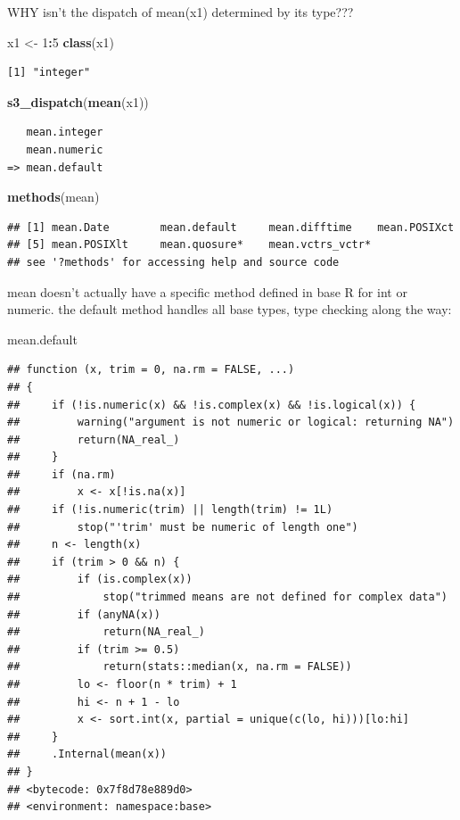\documentclass[]{book}
\newenvironment{Shaded}{\begin{snugshade}}{\end{snugshade}}
\newcommand{\DecValTok}[1]{\textcolor[rgb]{0.00,0.00,0.81}{#1}}
\newcommand{\KeywordTok}[1]{\textcolor[rgb]{0.13,0.29,0.53}{\textbf{#1}}}
\newcommand{\NormalTok}[1]{#1}
\newcommand{\OperatorTok}[1]{\textcolor[rgb]{0.81,0.36,0.00}{\textbf{#1}}}
\newcommand{\StringTok}[1]{\textcolor[rgb]{0.31,0.60,0.02}{#1}}
\begin{document}
WHY isn't the dispatch of mean(x1) determined by its type???

\begin{Shaded}
\begin{Highlighting}[]
\NormalTok{x1 <-}\StringTok{ }\DecValTok{1}\OperatorTok{:}\DecValTok{5}
\KeywordTok{class}\NormalTok{(x1)}
\end{Highlighting}
\end{Shaded}

\begin{verbatim}
[1] "integer"
\end{verbatim}

\begin{Shaded}
\begin{Highlighting}[]
\KeywordTok{s3_dispatch}\NormalTok{(}\KeywordTok{mean}\NormalTok{(x1))}
\end{Highlighting}
\end{Shaded}

\begin{verbatim}
   mean.integer
   mean.numeric
=> mean.default
\end{verbatim}

\begin{Shaded}
\begin{Highlighting}[]
\KeywordTok{methods}\NormalTok{(mean)}
\end{Highlighting}
\end{Shaded}

\begin{verbatim}
## [1] mean.Date        mean.default     mean.difftime    mean.POSIXct    
## [5] mean.POSIXlt     mean.quosure*    mean.vctrs_vctr*
## see '?methods' for accessing help and source code
\end{verbatim}

mean doesn't actually have a specific method defined in base R for int or numeric. the default method handles all base types, type checking along the way:

\begin{Shaded}
\begin{Highlighting}[]
\NormalTok{mean.default}
\end{Highlighting}
\end{Shaded}

\begin{verbatim}
## function (x, trim = 0, na.rm = FALSE, ...) 
## {
##     if (!is.numeric(x) && !is.complex(x) && !is.logical(x)) {
##         warning("argument is not numeric or logical: returning NA")
##         return(NA_real_)
##     }
##     if (na.rm) 
##         x <- x[!is.na(x)]
##     if (!is.numeric(trim) || length(trim) != 1L) 
##         stop("'trim' must be numeric of length one")
##     n <- length(x)
##     if (trim > 0 && n) {
##         if (is.complex(x)) 
##             stop("trimmed means are not defined for complex data")
##         if (anyNA(x)) 
##             return(NA_real_)
##         if (trim >= 0.5) 
##             return(stats::median(x, na.rm = FALSE))
##         lo <- floor(n * trim) + 1
##         hi <- n + 1 - lo
##         x <- sort.int(x, partial = unique(c(lo, hi)))[lo:hi]
##     }
##     .Internal(mean(x))
## }
## <bytecode: 0x7f8d78e889d0>
## <environment: namespace:base>
\end{verbatim}
\end{document}
